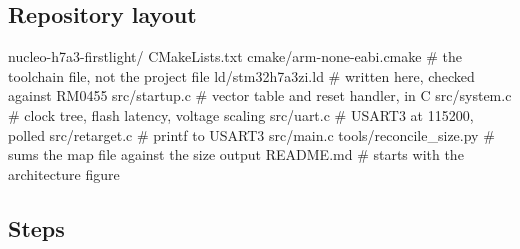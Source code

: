 \subsection*{Repository layout}

\begin{plaincode}
nucleo-h7a3-firstlight/
  CMakeLists.txt
  cmake/arm-none-eabi.cmake     # the toolchain file, not the project file
  ld/stm32h7a3zi.ld             # written here, checked against RM0455
  src/startup.c                 # vector table and reset handler, in C
  src/system.c                  # clock tree, flash latency, voltage scaling
  src/uart.c                    # USART3 at 115200, polled
  src/retarget.c                # printf to USART3
  src/main.c
  tools/reconcile_size.py       # sums the map file against the size output
  README.md                     # starts with the architecture figure
\end{plaincode}

\subsection*{Steps}

